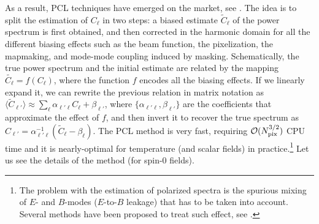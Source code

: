 As a result, \gls{PCL} techniques have emerged on the market, see \citet{Yu1969,Hauser1973,Wandelt2001,Hivon2001a,Efstathiou2004a}. The idea is to split the estimation of $C_{\ell}$ in two steps: a biased estimate $\tilde{C}_{\ell}$ of the power spectrum is first obtained, and then  corrected in the harmonic domain for all the different biasing effects such as the beam function, the pixelization, the mapmaking, and mode-mode coupling induced by masking. Schematically, the true power spectrum and the initial estimate are related by the mapping $\tilde{C_{\ell}}= f(C_{\ell})$, where the function $f$ encodes all the biasing effects. If we linearly expand it, we can rewrite the previous relation in matrix notation as $\langle\tilde{C}_{\ell'}\rangle \approx \sum_\ell \alpha_{\ell'\ell}C_{\ell} + \beta_{\ell'}$, where $\{\alpha_{\ell'\ell}, \beta_{\ell'}\}$ are the coefficients that approximate the effect of $f$, and then invert it to recover the true spectrum as $\hat{C}_{\ell'} = \alpha^{-1}_{\ell'\ell}(\tilde{C}_{\ell}-\beta_{\ell})$. 
The \gls{PCL} method is very fast, requiring $\mathcal{O}(N_{\rm{pix}}^{3/2})$ CPU time and it is nearly-optimal for temperature (and scalar fields) in practice.\footnote{The problem with the estimation of polarized spectra is the spurious mixing of $E$- and $B$-modes ($E$-to-$B$ leakage) that has to be taken into account. Several methods have been proposed to treat such effect, see \citet{Lewis2001,Bunn2003,Grain2009}.} Let us see the details of the method (for spin-0 fields).

